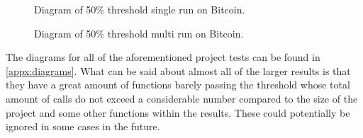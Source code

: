 \begin{figure}[H]
	\caption{Diagram of 50\% threshold single run on Bitcoin.}
	\label{fig:bc-50-single}
\end{figure}

\begin{figure}[H]
	\caption{Diagram of 50\% threshold multi run on Bitcoin.}
	\label{fig:bc-50-multi}
\end{figure}

The diagrams for all of the aforementioned project tests can be found in \cref{appx:diagrams}.
What can be said about almost all of the larger results is that they have a great amount of functions barely passing the threshold whose total
amount of calls do not exceed a considerable number compared to the size of the project and some other functions within the results. These could
potentially be ignored in some cases in the future.












